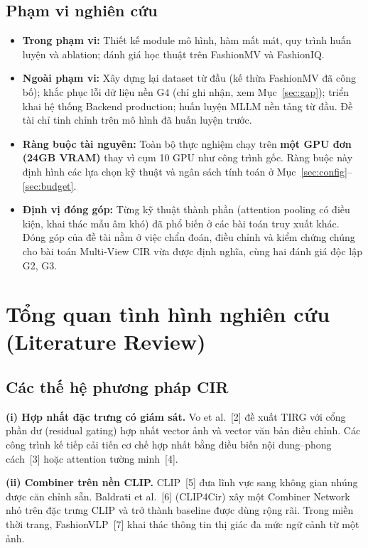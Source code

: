 \documentclass[a4paper]{article}
\begin{document}
\subsection{Phạm vi nghiên cứu}
\begin{itemize}
\item \textbf{Trong phạm vi:} Thiết kế module mô hình, hàm mất mát, quy trình huấn luyện và ablation; đánh giá học thuật trên FashionMV và FashionIQ.
\item \textbf{Ngoài phạm vi:} Xây dựng lại dataset từ đầu (kế thừa FashionMV đã công bố); khắc phục lỗi dữ liệu nền G4 (chỉ ghi nhận, xem Mục~\ref{sec:gap}); triển khai hệ thống Backend production; huấn luyện MLLM nền tảng từ đầu. Đề tài chỉ tinh chỉnh trên mô hình đã huấn luyện trước.
\item \textbf{Ràng buộc tài nguyên:} Toàn bộ thực nghiệm chạy trên \textbf{một GPU đơn (24GB VRAM)} thay vì cụm 10 GPU như công trình gốc. Ràng buộc này định hình các lựa chọn kỹ thuật và ngân sách tính toán ở Mục~\ref{sec:config}--\ref{sec:budget}.
\item \textbf{Định vị đóng góp:} Từng kỹ thuật thành phần (attention pooling có điều kiện, khai thác mẫu âm khó) đã phổ biến ở các bài toán truy xuất khác. Đóng góp của đề tài nằm ở việc chẩn đoán, điều chỉnh và kiểm chứng chúng cho bài toán Multi-View CIR vừa được định nghĩa, cùng hai đánh giá độc lập G2, G3.
\end{itemize}

\section{Tổng quan tình hình nghiên cứu (Literature Review)}

\subsection{Các thế hệ phương pháp CIR}

\textbf{(i) Hợp nhất đặc trưng có giám sát.} Vo et al.~[2] đề xuất TIRG với cổng phần dư (residual gating) hợp nhất vector ảnh và vector văn bản điều chỉnh. Các công trình kế tiếp cải tiến cơ chế hợp nhất bằng điều biến nội dung--phong cách~[3] hoặc attention tường minh~[4].

\textbf{(ii) Combiner trên nền CLIP.} CLIP~[5] đưa lĩnh vực sang không gian nhúng được căn chỉnh sẵn. Baldrati et al.~[6] (CLIP4Cir) xây một Combiner Network nhỏ trên đặc trưng CLIP và trở thành baseline được dùng rộng rãi. Trong miền thời trang, FashionVLP~[7] khai thác thông tin thị giác đa mức ngữ cảnh từ một ảnh.
\end{document}
